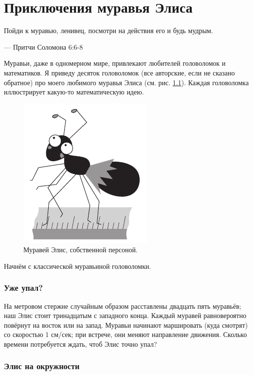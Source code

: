 \chapter{Приключения муравья Элиса}


\setlength{\epigraphwidth}{.67\textwidth}
\epigraph{Пойди к муравью, ленивец, посмотри на действия его и будь мудрым.
}{--- Притчи Соломона 6:6-8} 

Муравьи, даже в одномерном мире, привлекают любителей головоломок и математиков.
Я приведу десяток головоломок (все авторские, если не сказано обратное) про моего любимого муравья Элиса
(см. рис. \ref{pic:alice1}).
Каждая головоломка иллюстрирует какую-то математическую идею.

\begin{figure}[ht!]
\centering
\includegraphics[scale=.7]{pics/alice1}
\caption{Муравей Элис, собственной персоной.}
\label{pic:alice1}
\end{figure}

Начнём с классической муравьиной головоломки.

\subsection*{Уже упал?}\label{Уже упал?}

На метровом стержне случайным образом расставлены двадцать пять муравьёв; наш Элис стоит тринадцатым с западного конца.
Каждый муравей равновероятно повёрнут на восток или на запад.
Муравьи начинают маршировать (куда смотрят) со скоростью 1 см/сек;
при встрече, они меняют направление движения.
Сколько времени потребуется ждать, чтоб Элис точно упал?

\subsection*{Элис на окружности}\label{Элис на окружности}

